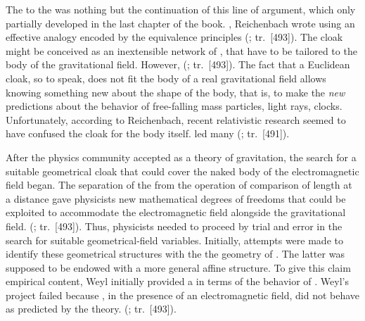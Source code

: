 \documentclass[final]{article}
\newcommand{\PRZL}{\citetitle{Reichenbach1928}\xspace}
\renewcommand{\rzlap}[2]{(\cite[#1]{Reichenbach1928}; tr.\ [#2])\xspace}
\begin{document}
The \Ap to the \PRZL was nothing but the continuation of this line of argument, which only partially developed in the last chapter of the book. , Reichenbach wrote using an effective analogy  encoded by the equivalence principles  \rzlap{354}{493}. The cloak might be conceived as an inextensible network of \rac, that have to be tailored to the body of the gravitational field. However,  \rzlap{354}{493}. The fact that a Euclidean cloak, so to speak, does not fit the body of a real gravitational field allows knowing something new about the shape of the body, that is, to make the \emph{new} predictions about the behavior of free-falling mass particles, light rays, clocks\etc. Unfortunately, according to Reichenbach, recent relativistic research seemed to have confused the cloak for the body itself.  led many  \rzlap{352}{491}. 

After the physics community accepted \gr as a theory of gravitation, the search for a suitable geometrical cloak that could cover the naked body of the electromagnetic field began. The separation of the  \Gtmn from the operation of comparison of length at a distance \gmn gave physicists new mathematical degrees of freedoms that could be exploited to accommodate the electromagnetic field alongside the gravitational field.  \rzlap{354}{493}. Thus, physicists needed to proceed by trial and error in the search for suitable geometrical-field variables. Initially, attempts were made to identify these geometrical structures with the  the geometry of \spti. The latter was supposed to be endowed with a more general affine structure. To give this claim empirical content, Weyl initially provided a  \Gtmn in terms of the behavior of \rac. Weyl's project failed because \rac, in the presence of an electromagnetic field, did not behave as predicted by the theory.  \rzlap{353}{493}.
\end{document}
